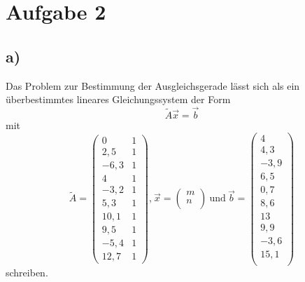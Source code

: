 \section{Aufgabe 2}
\subsection{a)}
Das Problem zur Bestimmung der Ausgleichsgerade lässt sich als ein überbestimmtes
lineares Gleichungssystem der Form
\begin{equation}
  \tilde{A} \vec{x} = \vec{b}
  \label{eqn:Ausgangsproblem}
\end{equation}
mit
\begin{equation*}
  \tilde{A} =
  \begin{pmatrix}
    0 & 1 \\
    2,5 & 1 \\
    -6,3 & 1 \\
    4 & 1 \\
    -3,2 & 1 \\
    5,3 & 1 \\
    10,1 & 1 \\
    9,5 & 1 \\
    -5,4 & 1 \\
    12,7 & 1
  \end{pmatrix}
  \text{,} \ \vec{x} =
  \begin{pmatrix}
    m \\
    n \\
  \end{pmatrix}
  \ \text{und} \ \vec{b} =
  \begin{pmatrix}
    4 \\
    4,3 \\
    -3,9 \\
    6,5 \\
    0,7 \\
    8,6 \\
    13 \\
    9,9 \\
    -3,6 \\
    15,1 \\
  \end{pmatrix}
\end{equation*}
schreiben.

